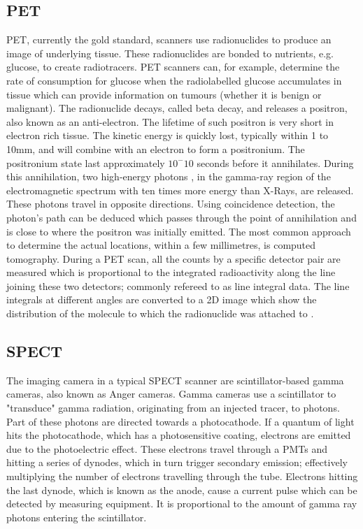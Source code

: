\subsection{PET}
\ac{PET}, currently the gold standard, scanners use radionuclides to produce an image of underlying tissue. These radionuclides are bonded to nutrients, e.g. glucose, to create radiotracers. \ac{PET} scanners can, for example, determine the rate of consumption for glucose when the radiolabelled glucose accumulates in tissue \citep{PETscan2003} which can provide information on tumours (whether it is benign or malignant). The radionuclide decays, called beta decay, and releases a positron, also known as an anti-electron. The lifetime of such positron is very short in electron rich tissue. The kinetic energy is quickly lost, typically within 1 to 10mm, and will combine with an electron to form a positronium. The positronium state last approximately $10^-10$ seconds before it annihilates. During this annihilation, two high-energy photons \citep{PETscan1999}, in the gamma-ray region of the electromagnetic spectrum with ten times more energy than X-Rays, are released. These photons travel in opposite directions. Using coincidence detection, the photon's path can be deduced which passes through the point of annihilation and is close to where the positron was initially emitted. The most common approach to determine the actual locations, within a few millimetres, is computed tomography. During a \ac{PET} scan, all the counts by a specific detector pair are measured which is proportional to the integrated radioactivity along the line joining these two detectors; commonly refereed to as line integral data. The line integrals at different angles are converted to a 2D image which show the distribution of the molecule to which the radionuclide was attached to \citep{cherry2006pet}.

\subsection{SPECT}
The imaging camera in a typical \ac{SPECT} scanner are scintillator-based gamma cameras, also known as Anger cameras. Gamma cameras use a scintillator to "transduce" gamma radiation, originating from an injected tracer, to photons. Part of these photons are directed towards a photocathode. If a quantum of light hits the photocathode, which has a photosensitive coating, electrons are emitted due to the photoelectric effect. These electrons travel through a \acp{PMT} and hitting a series of dynodes, which in turn trigger secondary emission; effectively multiplying the number of electrons travelling through the tube. Electrons hitting the last dynode, which is known as the anode, cause a current pulse which can be detected by measuring equipment. It is proportional to the amount of gamma ray photons entering the scintillator\citep{CZTTech2009}.

